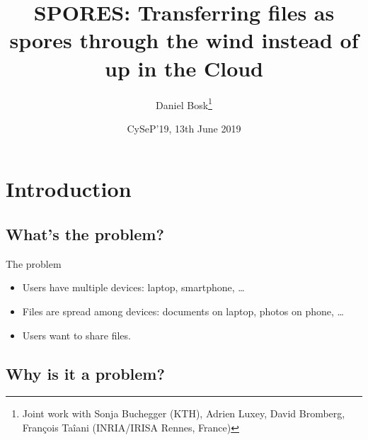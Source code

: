 \title{%
  SPORES: Transferring files as spores through the wind instead of up in the Cloud
}
\author{Daniel Bosk\thanks{%
    Joint work with Sonja Buchegger (KTH), Adrien Luxey, David Bromberg, 
    François Taîani (INRIA/IRISA Rennes, France)
  }}
\date{CySeP'19, 13th June 2019}


\mode*


\section{Introduction}

\subsection{What's the problem?}

\begin{frame}
  \begin{block}{The problem}
    \begin{itemize}
      \item Users have multiple devices: laptop, smartphone, \dots
      \item Files are spread among devices: documents on laptop, photos on phone, 
        \dots

        \pause

      \item Users want to share files.
    \end{itemize}
  \end{block}
\end{frame}

\subsection{Why is it a problem?}

